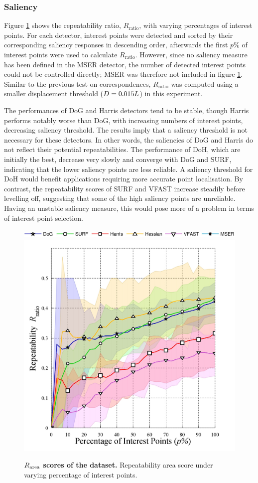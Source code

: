 \subsubsection{Saliency}

Figure \ref{fig/eval/graph_keypointnum} shows the repeatability ratio, $R_\textrm{ratio}$, with varying percentages of interest points. For each detector, interest points were detected and sorted by their corresponding saliency responses in descending order, afterwards the first $p\%$ of interest points were used to calculate $R_\mathrm{ratio}$. However, since no saliency measure has been defined in the MSER detector, the number of detected interest points could not be controlled directly; MSER was therefore not included in figure \ref{fig/eval/graph_keypointnum}. Similar to the previous test on correspondences, $R_\textrm{ratio}$ was computed using a smaller displacement threshold ($D = 0.015L$) in this experiment.   

The performances of DoG and Harris detectors tend to be stable, though Harris performs notably worse than DoG, with increasing numbers of interest points, \ie decreasing saliency threshold. The results imply that a saliency threshold is not necessary for these detectors. In other words, the saliencies of DoG and Harris do not reflect their potential repeatabilities. The performance of DoH, which are initially the best, decrease very slowly and converge with DoG and SURF, indicating that the lower saliency points are less reliable. A saliency threshold for DoH would benefit applications requiring more accurate point localisation. By contrast, the repeatability scores of SURF and VFAST increase steadily before levelling off, suggesting that some of the high saliency points are unreliable. Having an unstable saliency measure, this would pose more of a problem in terms of interest point selection. 

\begin{figure}[ht]
	\centering
	\includegraphics[width=0.70\linewidth]{./fig/eval/hlegend.jpg} \\ 
	\includegraphics[width=0.48\linewidth]{./fig/eval/graph_keypointnum.jpg}
	\caption{\textbf{$R_\textrm{area}$ scores of the \meshset dataset.} Repeatability area score under varying percentage of interest points.}
	\label{fig/eval/graph_keypointnum}	
\end{figure}

